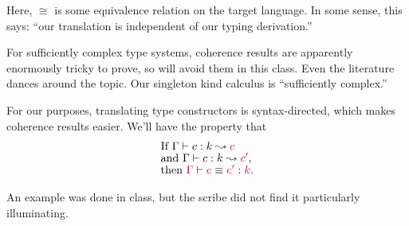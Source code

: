 \documentclass{article}
\newcommand{\target}[1]{{\color{purple}#1}}
\begin{document}
Here, $\cong$ is some equivalence relation on the target language. In some
sense, this says: ``our translation is independent of our typing derivation.''

For sufficiently complex type systems, coherence results are apparently
enormously tricky to prove, so will avoid them in this class. Even the
literature dances around the topic. Our singleton kind calculus is
``sufficiently complex.''

For our purposes, translating type constructors is syntax-directed, which makes
coherence results easier. We'll have the property that
\begin{align*}
&\text{If }\Gamma \vdash c : k \leadsto \target{c} \\[-1ex]
&\text{and }\Gamma \vdash c : k \leadsto \target{c'}, \\[-1ex]
&\text{then }\target{\Gamma} \vdash \target{e} \equiv \target{e'} : \target{k}.
\end{align*}

An example was done in class, but the scribe did not find it particularly
illuminating.
\end{document}
